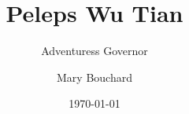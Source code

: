 ﻿\documentclass[10pt,twocolumn,twoside]{book}
\title{Peleps Wu Tian}
\subtitle{Adventuress Governor}
\author{Mary Bouchard}
\date{\ddmmmyyyydate\today}
\begin{document}
\frontmatter
{}
\pagestyle{empty}

\begin{titlepage}
    
\end{titlepage}

\blankpage

\mainmatter
\pagestyle{main}


\end{document}
